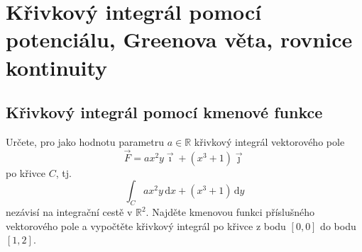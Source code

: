 


\section{Křivkový integrál pomocí potenciálu, Greenova věta, rovnice kontinuity}


\subsection{Křivkový integrál pomocí kmenové funkce}


Určete, pro jako hodnotu parametru $a\in \mathbb R$ křivkový integrál vektorového pole $$\vec F=ax^2y\vec\imath + (x^3+1)\vec\jmath$$ po křivce $C$, tj. $$\int_C ax^2y\,\mathrm dx+(x^3+1)\,\mathrm dy$$ nezávisí na integrační cestě v $\mathbb R^2$. Najděte kmenovou funkci příslušného vektorového pole a vypočtěte křivkový integrál po křivce z bodu $[0,0]$ do bodu $[1,2]$.

\reseni

